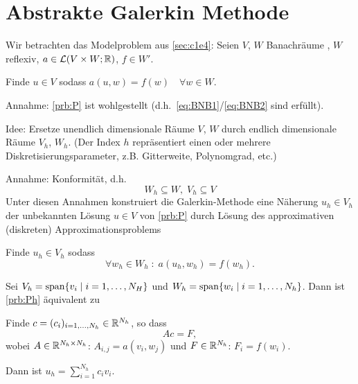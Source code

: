 \documentclass[../skript.tex]{subfiles}
\begin{document}
\section{Abstrakte Galerkin Methode}
\label{sec:c1e6}
Wir betrachten das Modelproblem aus \cref{sec:c1e4}:
Seien $V$, $W$ Banachräume , $W$ reflexiv, $a\in\mathcal{L}(V\times W;\mathbb{R})$, $ f \in W'$.
\addtocounter{problem}{-2}
\begin{problem} %
Finde $u \in V$ sodass $a(u, w) = f(w) \quad \forall w \in W$.
\end{problem}
\addtocounter{problem}{1}
Annahme: \cref{prb:P} ist wohlgestellt (d.h.~\cref{eq:BNB1}\slash{}\cref{eq:BNB2} sind erfüllt).

Idee: Ersetze unendlich dimensionale Räume $V$, $W$ durch endlich dimensionale Räume $V_h$, $W_h$. (Der Index $h$ repräsentiert einen oder mehrere Diskretisierungsparameter, z.B. Gitterweite, Polynomgrad, etc.)

Annahme: Konformität, d.h.
\[
	W_h \subseteq W, \; V_h \subseteq V 
\]
Unter diesen Annahmen konstruiert die Galerkin-Methode eine Näherung
$u_h\in V_h$ der unbekannten Lösung $u\in V$ von \cref{prb:P} durch Lösung
des approximativen (diskreten) Approximationsproblems
\begin{problem} %
\label{prb:Ph}
Finde $u_h \in V_h$ sodass
\[
	\forall w_h \in W_h \; : \; a(u_h, w_h) = f(w_h).
\]
\end{problem}

Sei $V_h = \operatorname*{span} \{v_i \mid i = 1,\ldots,N_H\}$ und $W_h = \operatorname*{span}\{w_i \mid i=1,\ldots,N_h\}$.
Dann ist \cref{prb:Ph} äquivalent zu
\begin{problem}
Finde $c=(c_i)_{i=1,\ldots,N_h}\in\mathbb{R}^{N_h}$, so dass 
\[Ac=F,\]
wobei $A\in\mathbb{R}^{N_h\times N_h}$: $A_{i,j}=a(v_i,w_j)$ und 
$F\in\mathbb{R}^{N_h}$: $F_i=f(w_i)$.
\end{problem}
Dann ist $u_h = \sum_{i=1}^{N_h}c_i v_i$.
\end{document}
